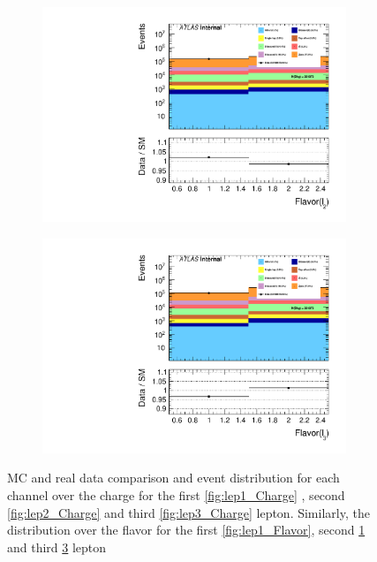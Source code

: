 \begin{figure}
{\begin{subfigure}{.425\textwidth}
        \includegraphics[width=\textwidth]{Figures/FeaturesHistograms/lep2_Flavor.pdf}
        \caption{}
        \label{fig:lep2_Flavor}
    \end{subfigure}
    \hfill
    \begin{subfigure}{.425\textwidth}
        \includegraphics[width=\textwidth]{Figures/FeaturesHistograms/lep3_Flavor.pdf}
        \caption{}
        \label{fig:lep3_Flavor}
    \end{subfigure}
    }
    \caption{\ac{MC} and real data comparison and event distribution for each channel over the charge for the first \ref{fig:lep1_Charge}
    , second \ref{fig:lep2_Charge} and third \ref{fig:lep3_Charge} lepton. Similarly, the distribution over the flavor
    for the first \ref{fig:lep1_Flavor}, second \ref{fig:lep2_Flavor} and third \ref{fig:lep3_Flavor} lepton}
\end{figure}
